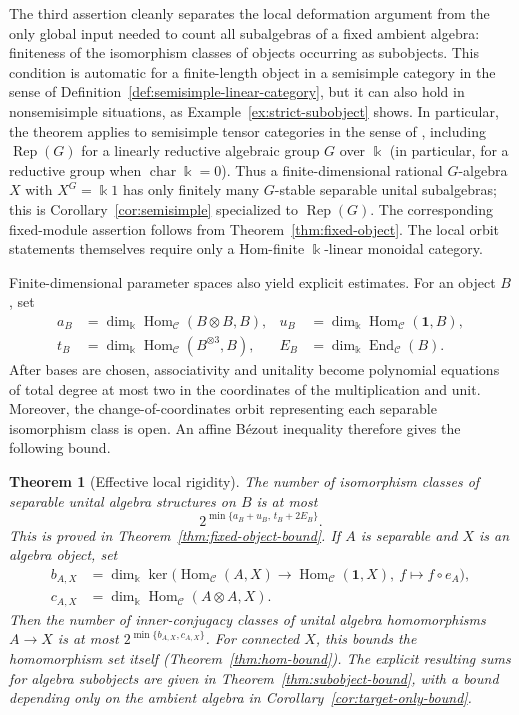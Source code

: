 \documentclass[11pt]{amsart}
\newtheorem{theorem}{Theorem}[section]
\theoremstyle{definition}
\theoremstyle{remark}
\newcommand{\C}{\mathcal C}
\newcommand{\one}{\mathbf 1}
\newcommand{\kk}{\Bbbk}
\DeclareMathOperator{\Hom}{Hom}
\DeclareMathOperator{\End}{End}
\DeclareMathOperator{\Rep}{Rep}
\begin{document}
The third assertion cleanly separates the local deformation argument from
the only global input needed to count all subalgebras of a fixed ambient
algebra: finiteness of the isomorphism classes of objects occurring as
subobjects.  This condition is automatic for a finite-length object in a
semisimple category in the sense of
Definition~\ref{def:semisimple-linear-category}, but it can also hold in
nonsemisimple situations, as Example~\ref{ex:strict-subobject} shows.  In
particular, the theorem applies to semisimple tensor categories in the sense
of \cite{EGNO}, including $\Rep(G)$ for a linearly reductive algebraic
group $G$ over $\kk$ (in particular, for a reductive group when
$\operatorname{char}\kk=0$).  Thus a finite-dimensional rational
$G$-algebra $X$ with
$X^G=\kk 1$ has only finitely many $G$-stable separable unital subalgebras;
this is Corollary~\ref{cor:semisimple} specialized to $\Rep(G)$.  The
corresponding fixed-module assertion follows from
Theorem~\ref{thm:fixed-object}.  The local orbit statements themselves
require only a Hom-finite $\kk$-linear monoidal category.

Finite-dimensional parameter spaces also yield explicit estimates.  For
an object $B$, set
\[
\begin{aligned}
 a_B&=\dim_{\kk}\Hom_{\C}(B\otimes B,B),&
 u_B&=\dim_{\kk}\Hom_{\C}(\one,B),\\
 t_B&=\dim_{\kk}\Hom_{\C}(B^{\otimes3},B),&
 E_B&=\dim_{\kk}\End_{\C}(B).
\end{aligned}
\]
After bases are chosen, associativity and unitality become polynomial
equations of total degree at most two in the coordinates of the
multiplication and unit.  Moreover, the change-of-coordinates orbit
representing each separable isomorphism class is open.  An affine B\'ezout
inequality therefore gives the following bound.

\begin{theorem}[Effective local rigidity]\label{thm:intro-effective}
The number of isomorphism classes of separable unital algebra structures on
$B$ is at most
\[
  2^{\min\{a_B+u_B,\,t_B+2E_B\}}.
\]
This is proved in Theorem~\ref{thm:fixed-object-bound}.
If $A$ is separable and $X$ is an algebra object, set
\[
\begin{aligned}
 b_{A,X}&=\dim_{\kk}\ker\bigl(\Hom_{\C}(A,X)\to
 \Hom_{\C}(\one,X),\ f\mapsto f\circ e_A\bigr),\\
 c_{A,X}&=\dim_{\kk}\Hom_{\C}(A\otimes A,X).
\end{aligned}
\]
Then the number of inner-conjugacy classes of unital algebra homomorphisms
$A\to X$ is at most $2^{\min\{b_{A,X},c_{A,X}\}}$.  For connected $X$,
this bounds the homomorphism set itself
\textup{(Theorem~\ref{thm:hom-bound})}.  The explicit resulting sums for
algebra subobjects are given in Theorem~\ref{thm:subobject-bound}, with a
bound depending only on the ambient algebra in
Corollary~\ref{cor:target-only-bound}.
\end{theorem}
\end{document}
